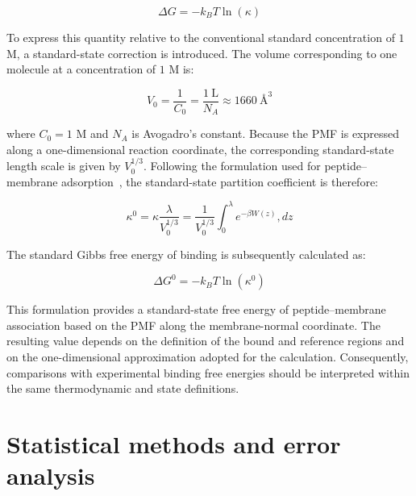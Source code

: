 \begin{equation}
\Delta G
=
-k_B T\ln(\kappa)
\end{equation}

To express this quantity relative to the conventional standard concentration of $1$ M, a standard-state correction is introduced. The volume corresponding to one molecule at a concentration of $1$ M is:

\begin{equation}
V_0
=
\frac{1}{C_0}
=
\frac{1~\mathrm{L}}{N_A}
\approx
1660~\text{\AA}^3
\end{equation}

where $C_0=1$ M and $N_A$ is Avogadro's constant. Because the PMF is expressed along a one-dimensional reaction coordinate, the corresponding standard-state length scale is given by $V_0^{1/3}$. Following the formulation used for peptide--membrane adsorption~\cite{DANI_METADINAMICA}, the standard-state partition coefficient is therefore:

\begin{equation}
\kappa^0
=
\kappa
\frac{\lambda}{V_0^{1/3}}
=
\frac{1}{V_0^{1/3}}
\int_0^\lambda
e^{-\beta W(z)}
,dz
\end{equation}

The standard Gibbs free energy of binding is subsequently calculated as:

\begin{equation}
\Delta G^0
=
-k_B T\ln(\kappa^0)
\end{equation}

This formulation provides a standard-state free energy of peptide--membrane association based on the PMF along the membrane-normal coordinate. The resulting value depends on the definition of the bound and reference regions and on the one-dimensional approximation adopted for the calculation. Consequently, comparisons with experimental binding free energies should be interpreted within the same thermodynamic and state definitions.



















\section{Statistical methods and error analysis}

